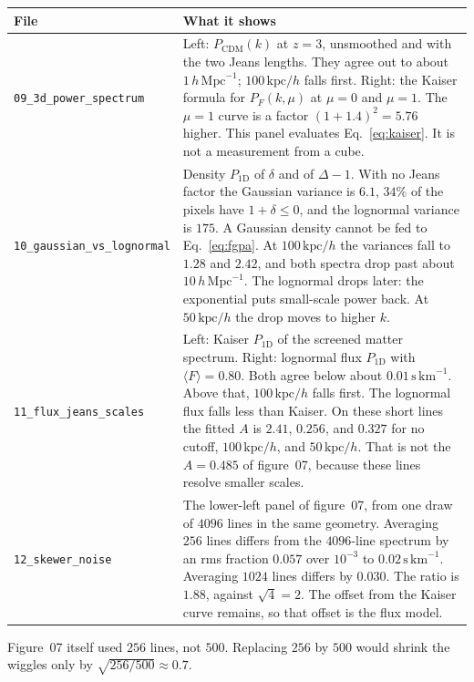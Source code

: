 \documentclass[11pt]{article}
\begin{document}
\begin{center}
\small
\begin{tabular}{@{}lp{}@{}}
\toprule
File & What it shows \\
\midrule
\texttt{09\_3d\_power\_spectrum} &
Left: $P_\mathrm{CDM}(k)$ at $z=3$, unsmoothed and with the two Jeans lengths. They agree out to about $1\,h\,\mathrm{Mpc}^{-1}$; $100\,\mathrm{kpc}/h$ falls first. Right: the Kaiser formula for $P_F(k,\mu)$ at $\mu=0$ and $\mu=1$. The $\mu=1$ curve is a factor $(1+1.4)^{2}=5.76$ higher. This panel evaluates Eq.~\eqref{eq:kaiser}. It is not a measurement from a cube. \\
\texttt{10\_gaussian\_vs\_lognormal} &
Density $P_{1\mathrm{D}}$ of $\delta$ and of $\Delta-1$. With no Jeans factor the Gaussian variance is $6.1$, $34\%$ of the pixels have $1+\delta\le 0$, and the lognormal variance is $175$. A Gaussian density cannot be fed to Eq.~\eqref{eq:fgpa}. At $100\,\mathrm{kpc}/h$ the variances fall to $1.28$ and $2.42$, and both spectra drop past about $10\,h\,\mathrm{Mpc}^{-1}$. The lognormal drops later: the exponential puts small-scale power back. At $50\,\mathrm{kpc}/h$ the drop moves to higher $k$. \\
\texttt{11\_flux\_jeans\_scales} &
Left: Kaiser $P_{1\mathrm{D}}$ of the screened matter spectrum. Right: lognormal flux $P_{1\mathrm{D}}$ with $\langle F\rangle=0.80$. Both agree below about $0.01\,\mathrm{s\,km}^{-1}$. Above that, $100\,\mathrm{kpc}/h$ falls first. The lognormal flux falls less than Kaiser. On these short lines the fitted $A$ is $2.41$, $0.256$, and $0.327$ for no cutoff, $100\,\mathrm{kpc}/h$, and $50\,\mathrm{kpc}/h$. That is not the $A=0.485$ of figure~07, because these lines resolve smaller scales. \\
\texttt{12\_skewer\_noise} &
The lower-left panel of figure~07, from one draw of $4096$ lines in the same geometry. Averaging $256$ lines differs from the $4096$-line spectrum by an rms fraction $0.057$ over $10^{-3}$ to $0.02\,\mathrm{s\,km}^{-1}$. Averaging $1024$ lines differs by $0.030$. The ratio is $1.88$, against $\sqrt{4}=2$. The offset from the Kaiser curve remains, so that offset is the flux model. \\
\bottomrule
\end{tabular}
\end{center}

Figure~07 itself used $256$ lines, not $500$. Replacing $256$ by $500$ would shrink the wiggles only by $\sqrt{256/500}\approx 0.7$.
\end{document}
